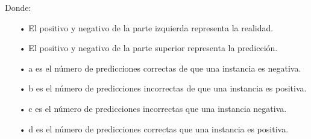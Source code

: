 \documentclass[a4paper, 12pt]{article}
\begin{document}
Donde:\par
\vskip 0.1cm
\begin{enumerate}
\item[•] El positivo y negativo de la parte izquierda representa la realidad.\par
\item[•] El positivo y negativo de la parte superior representa la predicción.\par
\item[•] a es el número de predicciones correctas de que una instancia es negativa.\par
\item[•] b es el número de predicciones incorrectas de que una instancia es positiva.\par
\item[•] c es el número de predicciones incorrectas que una instancia negativa.\par
\item[•] d es el número de predicciones correctas que una instancia es positiva.\par
\end{enumerate}
\end{document}
